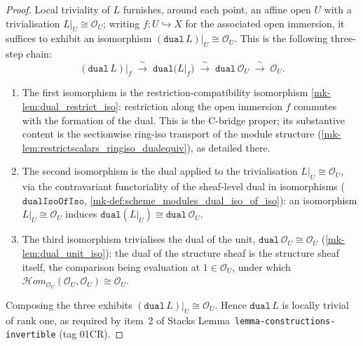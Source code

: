\begin{proof}
  \leanok
  Local triviality of \(L\) furnishes, around each point, an affine open \(U\) with a
  trivialisation \(L|_U \cong \mathcal{O}_U\); writing \(f : U \hookrightarrow X\) for the
  associated open immersion, it suffices to exhibit an isomorphism
  \((\mathtt{dual}\,L)|_U \cong \mathcal{O}_U\). This is the following three-step chain:
  \[
    (\mathtt{dual}\,L)\big|_f
      \;\xrightarrow{\ \sim\ }\; \mathtt{dual}\bigl(L|_f\bigr)
      \;\xrightarrow{\ \sim\ }\; \mathtt{dual}\,\mathcal{O}_U
      \;\xrightarrow{\ \sim\ }\; \mathcal{O}_U.
  \]
  \begin{enumerate}
    \item The first isomorphism is the restriction-compatibility isomorphism
      \ref{mk-lem:dual_restrict_iso}: restriction along the open immersion \(f\) commutes
      with the formation of the dual. This is the C-bridge proper; its substantive content
      is the sectionwise ring-iso transport of the module structure
      (\ref{mk-lem:restrictscalars_ringiso_dualequiv}), as detailed there.
    \item The second isomorphism is the dual applied to the trivialisation
      \(L|_U \cong \mathcal{O}_U\), via the contravariant functoriality of the sheaf-level
      dual in isomorphisms (\(\mathtt{dualIsoOfIso}\),
      \ref{mk-def:scheme_modules_dual_iso_of_iso}): an isomorphism \(L|_U \cong \mathcal{O}_U\)
      induces \(\mathtt{dual}(L|_U) \cong \mathtt{dual}\,\mathcal{O}_U\).
    \item The third isomorphism trivialises the dual of the unit,
      \(\mathtt{dual}\,\mathcal{O}_U \cong \mathcal{O}_U\) (\ref{mk-lem:dual_unit_iso}):
      the dual of the structure sheaf is the structure sheaf itself, the comparison being
      evaluation at \(1 \in \mathcal{O}_U\), under which
      \(\mathcal{H}om_{\mathcal{O}_U}(\mathcal{O}_U, \mathcal{O}_U) \cong \mathcal{O}_U\).
  \end{enumerate}
  Composing the three exhibits \((\mathtt{dual}\,L)|_U \cong \mathcal{O}_U\). Hence
  \(\mathtt{dual}\,L\) is locally trivial of rank one, as required by item~2 of Stacks
  Lemma~\texttt{lemma-constructions-invertible} (tag 01CR).
\end{proof}

